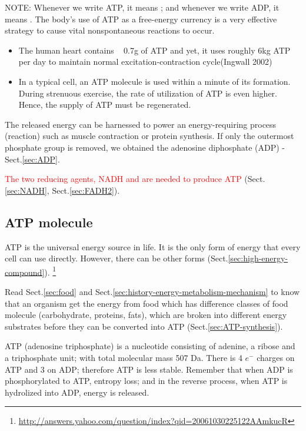 NOTE: Whenever we write ATP, it means ; and whenever we write ADP,
it means . The body's use of ATP as a free-energy currency is a
very effective strategy to cause vital nonspontaneous reactions to occur.

\begin{itemize}
  \item  The human heart contains ~ 0.7g of ATP and yet, it uses roughly 6kg ATP
  per day to maintain normal excitation-contraction cycle(Ingwall 2002)

  \item In a typical cell, an ATP molecule is used within a minute of its
  formation.  During strenuous exercise, the rate of utilization of ATP is even
  higher. Hence, the supply of ATP must be regenerated.
\end{itemize}

The released energy can be harnessed to power an energy-requiring
process (reaction) such as muscle contraction or protein synthesis. If
only the outermost phosphate group is removed, we obtained the
adenosine diphosphate (ADP) - Sect.\ref{sec:ADP}.

\textcolor{red}{The two reducing agents, NADH and  are needed to
produce ATP} (Sect.\ref{sec:NADH}, Sect.\ref{sec:FADH2}).


\subsection{ATP molecule}
\label{sec:ATP-molecule}

\begin{framed}
  ATP is the universal energy source in life. It is the only form of
  energy that every cell can use directly. However, there can be other forms
  (Sect.\ref{sec:high-energy-compound}).
  \footnote{\url{http://answers.yahoo.com/question/index?qid=20061030225122AAmkucR}}

  Read Sect.\ref{sec:food} and
  Sect.\ref{sec:history-energy-metabolism-mechanism} to know that an organism
  get the energy from food which has difference classes of food molecule
  (carbohydrate, proteins, fats), which are broken into different energy
  substrates before they can be converted into ATP
  (Sect.\ref{sec:ATP-synthesis}).


\end{framed}

ATP (adenosine triphosphate) is a nucleotide consisting of adenine, a
ribose and a triphosphate unit; with total molecular mass 507 Da.
There is 4 $e^{-}$ charges on ATP and 3 on ADP; therefore ATP is less stable.
Remember that when ADP is phosphorylated to ATP, entropy loss; and in the
reverse process, when ATP is hydrolized into ADP, energy is released.

